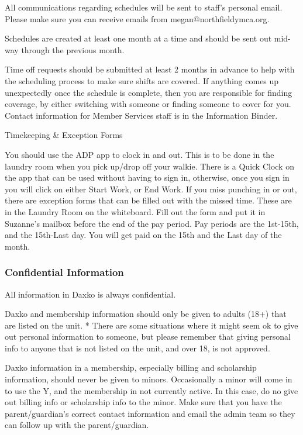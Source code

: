 \documentclass[
]{report}
\begin{document}
All communications regarding schedules will be sent to staff's personal
email. Please make sure you can receive emails from
megan@northfieldymca.org.

Schedules are created at least one month at a time and should be sent
out mid-way through the previous month.

Time off requests should be submitted at least 2 months in advance to
help with the scheduling process to make sure shifts are covered. If
anything comes up unexpectedly once the schedule is complete, then you
are responsible for finding coverage, by either switching with someone
or finding someone to cover for you. Contact information for Member
Services staff is in the Information Binder.

Timekeeping \& Exception Forms

You should use the ADP app to clock in and out. This is to be done in
the laundry room when you pick up/drop off your walkie. There is a Quick
Clock on the app that can be used without having to sign in, otherwise,
once you sign in you will click on either Start Work, or End Work. If
you miss punching in or out, there are exception forms that can be
filled out with the missed time. These are in the Laundry Room on the
whiteboard. Fill out the form and put it in Suzanne's mailbox before the
end of the pay period. Pay periods are the 1st-15th, and the 15th-Last
day. You will get paid on the 15th and the Last day of the month.

\hypertarget{confidential-information}{%
\subsubsection{Confidential
Information}\label{confidential-information}}

All information in Daxko is always confidential.

Daxko and membership information should only be given to adults (18+)
that are listed on the unit. * There are some situations where it might
seem ok to give out personal information to someone, but please remember
that giving personal info to anyone that is not listed on the unit, and
over 18, is not approved.

Daxko information in a membership, especially billing and scholarship
information, should never be given to minors. Occasionally a minor will
come in to use the Y, and the membership in not currently active. In
this case, do no give out billing info or scholarship info to the minor.
Make sure that you have the parent/guardian's correct contact
information and email the admin team so they can follow up with the
parent/guardian.
\end{document}
